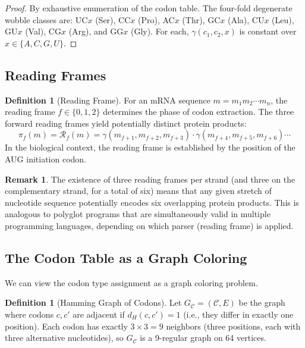\documentclass[12pt,a4paper]{article}
\theoremstyle{definition}
\newtheorem{definition}[theorem]{Definition}
\newtheorem{remark}[theorem]{Remark}
\begin{document}
\begin{proof}
By exhaustive enumeration of the codon table. The four-fold degenerate wobble classes are: UC$x$ (Ser), CC$x$ (Pro), AC$x$ (Thr), GC$x$ (Ala), CU$x$ (Leu), GU$x$ (Val), CG$x$ (Arg), and GG$x$ (Gly). For each, $\gamma(c_1, c_2, x)$ is constant over $x \in \{A, C, G, U\}$.
\end{proof}

\subsection{Reading Frames}

\begin{definition}[Reading Frame]\label{def:reading-frame}
For an mRNA sequence $m = m_1 m_2 \cdots m_n$, the reading frame $f \in \{0, 1, 2\}$ determines the phase of codon extraction. The three forward reading frames yield potentially distinct protein products:
\[
  \pi_f(m) = \mathcal{R}_f(m) = \gamma(m_{f+1}, m_{f+2}, m_{f+3}) \cdot \gamma(m_{f+4}, m_{f+5}, m_{f+6}) \cdots
\]
In the biological context, the reading frame is established by the position of the AUG initiation codon.
\end{definition}

\begin{remark}
The existence of three reading frames per strand (and three on the complementary strand, for a total of six) means that any given stretch of nucleotide sequence potentially encodes six overlapping protein products. This is analogous to polyglot programs that are simultaneously valid in multiple programming languages, depending on which parser (reading frame) is applied.
\end{remark}

\subsection{The Codon Table as a Graph Coloring}

We can view the codon type assignment as a graph coloring problem.

\begin{definition}[Hamming Graph of Codons]\label{def:hamming-graph}
Let $G_\mathcal{C} = (\mathcal{C}, E)$ be the graph where codons $c, c'$ are adjacent if $d_H(c, c') = 1$ (i.e., they differ in exactly one position). Each codon has exactly $3 \times 3 = 9$ neighbors (three positions, each with three alternative nucleotides), so $G_\mathcal{C}$ is a 9-regular graph on 64 vertices.
\end{definition}
\end{document}
